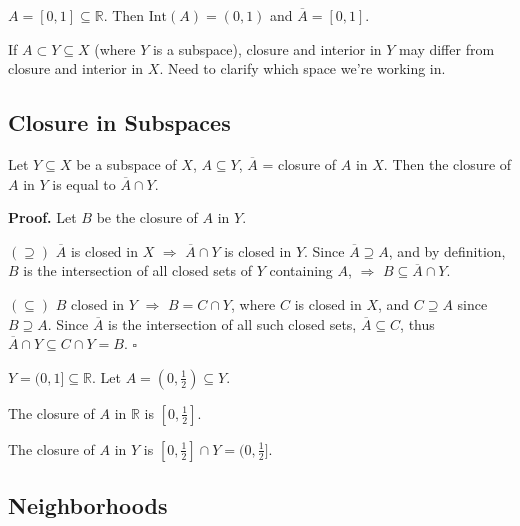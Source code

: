 \documentclass[11pt]{report}
\renewenvironment{proof}[1][Proof]{\noindent\textbf{#1.} }{\hfill$\square$\par\vspace{5pt}}
\begin{document}
\begin{exbox}
$A = [0, 1] \subseteq \mathbb{R}$. Then $\text{Int}(A) = (0, 1)$ and $\overline{A} = [0, 1]$.
\end{exbox}

\begin{rembox}
If $A \subset Y \subseteq X$ (where $Y$ is a subspace), closure and interior in $Y$ may differ from closure and interior in $X$. Need to clarify which space we're working in.
\end{rembox}

\subsection{Closure in Subspaces}

\begin{thmbox}
Let $Y \subseteq X$ be a subspace of $X$, $A \subseteq Y$, $\overline{A}$ = closure of $A$ in $X$. Then the closure of $A$ in $Y$ is equal to $\overline{A} \cap Y$.
\end{thmbox}

\begin{proof}
Let $B$ be the closure of $A$ in $Y$.

$(\supseteq)$ $\overline{A}$ is closed in $X$ $\Rightarrow$ $\overline{A} \cap Y$ is closed in $Y$. Since $\overline{A} \supseteq A$, and by definition, $B$ is the intersection of all closed sets of $Y$ containing $A$, $\Rightarrow$ $B \subseteq \overline{A} \cap Y$.

$(\subseteq)$ $B$ closed in $Y$ $\Rightarrow$ $B = C \cap Y$, where $C$ is closed in $X$, and $C \supseteq A$ since $B \supseteq A$. Since $\overline{A}$ is the intersection of all such closed sets, $\overline{A} \subseteq C$, thus $\overline{A} \cap Y \subseteq C \cap Y = B$.
\end{proof}

\begin{exbox}
$Y = (0, 1] \subseteq \mathbb{R}$. Let $A = (0, \frac{1}{2}) \subseteq Y$.

The closure of $A$ in $\mathbb{R}$ is $[0, \frac{1}{2}]$.

The closure of $A$ in $Y$ is $[0, \frac{1}{2}] \cap Y = (0, \frac{1}{2}]$.
\end{exbox}

\subsection{Neighborhoods}
\end{document}
